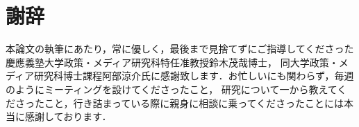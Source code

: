 \chapter{謝辞}
\label{thanks}

本論文の執筆にあたり，常に優しく，最後まで見捨てずにご指導してくださった慶應義塾大学政策・メディア研究科特任准教授鈴木茂哉博士，
同大学政策・メディア研究科博士課程阿部涼介氏に感謝致します．お忙しいにも関わらず，毎週のようにミーティングを設けてくださったこと，
研究について一から教えてくださったこと，行き詰まっている際に親身に相談に乗ってくださったことには本当に感謝しております．

